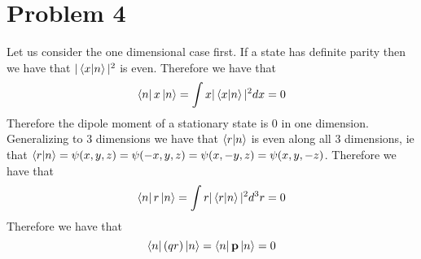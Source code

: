 \documentclass[11pt]{article}
\begin{document}
\section*{Problem 4}
Let us consider the one dimensional case first. If a state has definite parity then 
we have that $|\bra{x}\ket{n}|^2$ is even. Therefore we have that 
$$\bra{n}x\ket{n}=\int x|\bra{x}\ket{n}|^2 dx=0$$
Therefore the dipole moment of a stationary state is $0$ in one dimension. 
Generalizing to 3 dimensions we have that $\bra{r}\ket{n}$ is even along all 
3 dimensions, ie that $\bra{r}\ket{n}=\psi(x,y,z)=
\psi(-x,y,z)=\psi(x,-y,z)=\psi(x,y,-z)$. Therefore we have that 
$$\bra{n}r\ket{n}=\int r|\bra{r}\ket{n}|^2 d^3r=0$$
Therefore we have that
$$\bra{n}(qr)\ket{n}=\bra{n}\mathbf{p}\ket{n}=0$$
\end{document}

